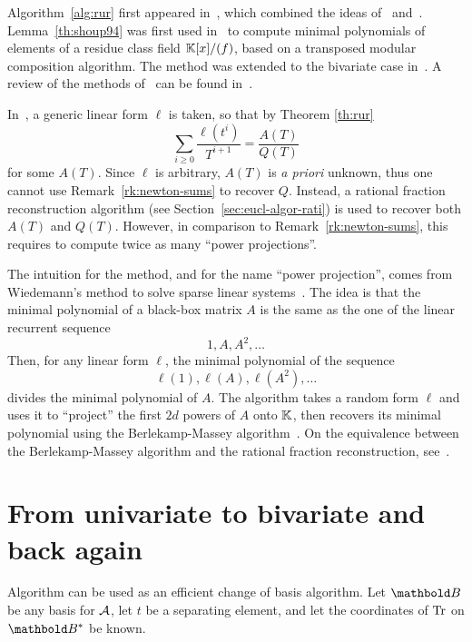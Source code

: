 \begin{remark}
  \label{rk:shoups-algorithm-1}
    Algorithm~\ref{alg:rur}
  first appeared in~\cite{bostan+salvy+schost03}, which combined the
  ideas of~\cite{rouiller99}
  and~\cite{shoup94,shoup95,shoup99}. Lemma~\ref{th:shoup94} was first
  used in~\cite{shoup94} to compute minimal polynomials of elements of
  a residue class field $\mathbb{K}[x]/(f)$, based on a transposed modular
  composition algorithm. The method was extended to the bivariate case
  in~\cite{shoup99}. A review of the methods
  of~\cite{shoup94,shoup95,shoup99} can be found
  in~\cite[$\S$6]{Ka2K}.

  In~\cite{shoup94,shoup99}, a generic linear form $\ell$ is taken, so
  that by Theorem \ref{th:rur}
  \[\sum_{i\ge0}\frac{\ell(t^i)}{T^{i+1}}=\frac{A(T)}{Q(T)}\]
  for some $A(T)$. Since $\ell$ is arbitrary, $A(T)$ is \emph{a
    priori} unknown, thus one cannot use Remark~\ref{rk:newton-sums}
  to recover $Q$. Instead, a rational fraction reconstruction
  algorithm (see Section~\ref{sec:eucl-algor-rati}) is used to recover
  both $A(T)$ and $Q(T)$. However, in comparison to
  Remark~\ref{rk:newton-sums}, this requires to compute twice as many
  ``power projections''.
  
  The intuition for the method, and for the name ``power projection'',
  comes from Wiedemann's method to solve sparse linear
  systems~\cite{wiedemann:sparse}. The idea is that the minimal
  polynomial of a black-box matrix $A$ is the same as the one of the
  linear recurrent sequence
  \[1,A,A^2,\ldots\] 
  Then, for any linear form $\ell$, the minimal polynomial of the sequence
  \[\ell(1),\ell(A),\ell(A^2),\ldots\]
  divides the minimal polynomial of $A$. The algorithm takes a random
  form $\ell$ and uses it to ``project'' the first $2d$ powers of $A$
  onto $\mathbb{K}$, then recovers its minimal polynomial using the
  Berlekamp-Massey algorithm~\cite{massey69}. On the equivalence
  between the Berlekamp-Massey algorithm and the rational fraction
  reconstruction, see~\cite{dornstetter87}.
\end{remark}


\section{From univariate to bivariate and back again}
\label{sec:from-univ-bivar}

Algorithm  can be used as an efficient change of basis
algorithm. Let $\basis{B}$ be any basis for $\mathcal{A}$, let $t$ be a
separating element, and let the coordinates of $\operatorname{Tr}$ on
$\dual{\basis{B}}$ be known.

